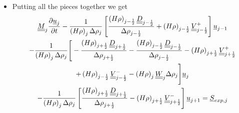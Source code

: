 \begin{itemize} 

 \item Putting all the pieces together we get 
 \begin{multline}
  \underline{\underline{M}}_{j}\frac{\partial{ \underline{u}_j}}{\partial{ t}} 
  -\frac{1}{\left ( H\rho \right )_j \Delta\rho_j}
  \left[ \frac{\left ( H\rho\right )_{j-\frac{1}{2}}
  \underline{\underline{D}}_{j-\frac{1}{2}}  }
  {\Delta\rho_{j-\frac{1}{2}}}+
  \left ( H\rho\right )_{j-\frac{1}{2}}
  \underline{\underline{V}}_{j-\frac{1}{2}}^+
  \right]{\underline{u}}_{j-1} \\
  -\frac{1}{\left ( H\rho \right )_j \Delta\rho_j}
  \Bigg [ -\frac{\left ( H\rho\right )_{j+\frac{1}{2}}
  \underline{\underline{D}}_{j+\frac{1}{2}}  }
  {\Delta\rho_{j+\frac{1}{2}}} -
  \frac{\left ( H\rho\right )_{j-\frac{1}{2}}
  \underline{\underline{D}}_{j-\frac{1}{2}}  }
  {\Delta\rho_{j-\frac{1}{2}}} 
  - \left ( H\rho \right )_{j+\frac{1}{2}}
  \underline{\underline{V}}_{j+\frac{1}{2}}^+\\
  +\left ( H\rho \right )_{j-\frac{1}{2}}
  \underline{\underline{V}}_{j-\frac{1}{2}}^-
  -\left ( H\rho \right )_{j}
  \underline{\underline{W}}_{j}\Delta\rho_j
  \Bigg ] {\underline{u}}_{j} \\
  -\frac{1}{\left ( H\rho \right )_j \Delta\rho_j}
  \left[\frac{\left ( H\rho\right )_{j+\frac{1}{2}}
  \underline{\underline{D}}_{j+\frac{1}{2}}  }
  {\Delta\rho_{j+\frac{1}{2}}}
  - \left ( H\rho \right )_{j+\frac{1}{2}}
  \underline{\underline{V}}_{j+\frac{1}{2}}^-
  \right] {\underline{u}}_{j+1} = \underline{S}_{exp,j}
 \end{multline}
\end{itemize}

